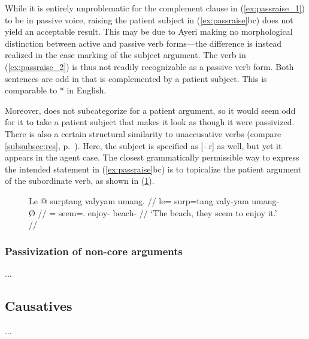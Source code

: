 While it is entirely unproblematic for the complement clause in
(\ref{ex:passraise_1}) to be in passive voice, raising the patient subject in
(\ref{ex:passraise}bc) does not yield an acceptable result. This may be due to
Ayeri making no morphological distinction between active and passive verb
forms---the difference is instead realized in the case marking of the subject
argument. The verb  in (\ref{ex:passraise_2}) is thus not
readily recognizable as a passive verb form. Both sentences are odd in that
 is complemented by a patient subject. This is
comparable to * in English.

Moreover,  does not subcategorize for a patient argument,
so it would seem odd for it to take a patient subject that makes it look as
though it were passivized. There is also a certain structural similarity to
unaccusative verbs (compare \autoref{subsubsec:res},
p.~\pageref{subsubsec:res}). Here, the subject is specified as [–\,r] as well,
but yet it appears in the agent case. The closest grammatically permissible way
to express the intended statement in (\ref{ex:passraise}bc) is to topicalize
the patient argument of the subordinate verb, as shown in (\ref{ex:raisept}).

\begin{figure}
\ex\label{ex:raisept}\begingl
	\gla Le @ surptang valyyam umang. //
	\glb le= surp=tang valy-yam umang-Ø //
	\glc \PatTI{}= seem=\TplM.\Aarg{} enjoy-\Ptcp{} beach-\Top{} //
	\glft `The beach, they seem to enjoy it.' //
\endgl\xe
\end{figure}

\subsubsection{Passivization of non-core arguments}

...

\subsection{Causatives}
\label{subsubsec:valincr}

...








